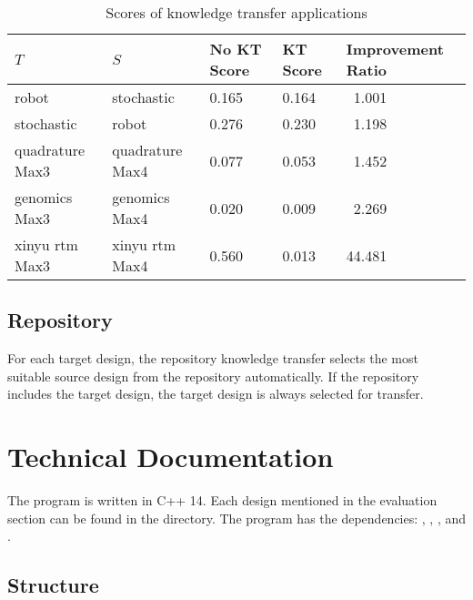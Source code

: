 \documentclass[10pt,a4paper]{article}
\begin{document}
\begin{table}[H]
	\begin{tabularx}{\linewidth}{X X X X X}
		\hline
		$T$ & $S$ & No KT Score & KT Score & Improvement Ratio\\
		\hline
		robot & stochastic & 0.165 & 0.164 & $\phantom{0}$1.001\\
		stochastic & robot & 0.276 & 0.230 & $\phantom{0}$1.198\\
		quadrature Max3 & quadrature Max4 & 0.077 & 0.053 & $\phantom{0}$1.452\\
		genomics Max3 & genomics Max4 & 0.020 & 0.009 & $\phantom{0}$2.269\\
		xinyu rtm Max3 & xinyu rtm Max4 & 0.560 & 0.013 & 44.481\\
		\hline
	\end{tabularx}
	\caption{Scores of knowledge transfer applications}
\end{table}

\subsection{Repository}

For each target design, the repository knowledge transfer selects the most suitable source design from the repository automatically. If the repository includes the target design, the target design is always selected for transfer.
\section{Technical Documentation}

The program is written in C++ 14. Each design mentioned in the evaluation section can be found in the  directory. The program has the dependencies: , , ,  and .

\subsection{Structure}
\end{document}

